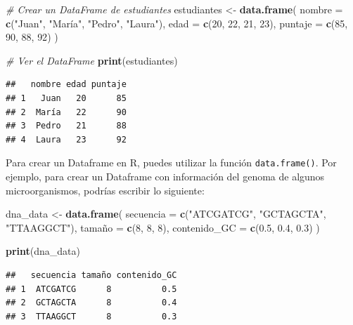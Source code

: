 \documentclass[
]{book}
\newenvironment{Shaded}{\begin{snugshade}}{\end{snugshade}}
\newcommand{\AttributeTok}[1]{\textcolor[rgb]{0.13,0.29,0.53}{#1}}
\newcommand{\CommentTok}[1]{\textcolor[rgb]{0.56,0.35,0.01}{\textit{#1}}}
\newcommand{\DecValTok}[1]{\textcolor[rgb]{0.00,0.00,0.81}{#1}}
\newcommand{\FloatTok}[1]{\textcolor[rgb]{0.00,0.00,0.81}{#1}}
\newcommand{\FunctionTok}[1]{\textcolor[rgb]{0.13,0.29,0.53}{\textbf{#1}}}
\newcommand{\NormalTok}[1]{#1}
\newcommand{\OtherTok}[1]{\textcolor[rgb]{0.56,0.35,0.01}{#1}}
\newcommand{\StringTok}[1]{\textcolor[rgb]{0.31,0.60,0.02}{#1}}
\begin{document}
\begin{Shaded}
\begin{Highlighting}[]
\CommentTok{\# Crear un DataFrame de estudiantes}
\NormalTok{estudiantes }\OtherTok{\textless{}{-}} \FunctionTok{data.frame}\NormalTok{(}
  \AttributeTok{nombre =} \FunctionTok{c}\NormalTok{(}\StringTok{"Juan"}\NormalTok{, }\StringTok{"María"}\NormalTok{, }\StringTok{"Pedro"}\NormalTok{, }\StringTok{"Laura"}\NormalTok{),}
  \AttributeTok{edad =} \FunctionTok{c}\NormalTok{(}\DecValTok{20}\NormalTok{, }\DecValTok{22}\NormalTok{, }\DecValTok{21}\NormalTok{, }\DecValTok{23}\NormalTok{),}
  \AttributeTok{puntaje =} \FunctionTok{c}\NormalTok{(}\DecValTok{85}\NormalTok{, }\DecValTok{90}\NormalTok{, }\DecValTok{88}\NormalTok{, }\DecValTok{92}\NormalTok{)}
\NormalTok{)}

\CommentTok{\# Ver el DataFrame}
\FunctionTok{print}\NormalTok{(estudiantes)}
\end{Highlighting}
\end{Shaded}

\begin{verbatim}
##   nombre edad puntaje
## 1   Juan   20      85
## 2  María   22      90
## 3  Pedro   21      88
## 4  Laura   23      92
\end{verbatim}

Para crear un Dataframe en R, puedes utilizar la función \texttt{data.frame()}.
Por ejemplo, para crear un Dataframe con información del genoma de algunos microorganismos, podrías escribir lo siguiente:

\begin{Shaded}
\begin{Highlighting}[]
\NormalTok{dna\_data }\OtherTok{\textless{}{-}} \FunctionTok{data.frame}\NormalTok{(}
  \AttributeTok{secuencia =} \FunctionTok{c}\NormalTok{(}\StringTok{"ATCGATCG"}\NormalTok{, }\StringTok{"GCTAGCTA"}\NormalTok{, }\StringTok{"TTAAGGCT"}\NormalTok{),}
\NormalTok{  tamaño }\OtherTok{=} \FunctionTok{c}\NormalTok{(}\DecValTok{8}\NormalTok{, }\DecValTok{8}\NormalTok{, }\DecValTok{8}\NormalTok{),}
  \AttributeTok{contenido\_GC =} \FunctionTok{c}\NormalTok{(}\FloatTok{0.5}\NormalTok{, }\FloatTok{0.4}\NormalTok{, }\FloatTok{0.3}\NormalTok{)}
\NormalTok{)}

\FunctionTok{print}\NormalTok{(dna\_data)}
\end{Highlighting}
\end{Shaded}

\begin{verbatim}
##   secuencia tamaño contenido_GC
## 1  ATCGATCG      8          0.5
## 2  GCTAGCTA      8          0.4
## 3  TTAAGGCT      8          0.3
\end{verbatim}
\end{document}
